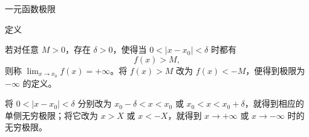 \documentclass[aspectratio=169,10pt,fontset=fandol]{ctexbeamer}
\newenvironment{warning}{\par\noindent\textbf{注：}\quad}{\par\vspace{0.8em}}
\begin{document}
\begin{frame}[t,fragile]{一元函数极限}
\normalsize
\begin{block}{定义}
{\normalsize

若对任意 \(M>0\)，存在 \(\delta>0\)，使得当 \(0<|x-x_0|<\delta\) 时都有
\[
f(x)>M,
\]
则称 \(\lim_{x\to x_0}f(x)=+\infty\)。将 \(f(x)>M\) 改为 \(f(x)<-M\)，便得到极限为 \(-\infty\) 的定义。

将 \(0<|x-x_0|<\delta\) 分别改为 \(x_0-\delta<x<x_0\) 或 \(x_0<x<x_0+\delta\)，就得到相应的单侧无穷极限；将它改为 \(x>X\) 或 \(x<-X\)，就得到 \(x\to+\infty\) 或 \(x\to-\infty\) 时的无穷极限。

}
\end{block}
\end{frame}
\end{document}
